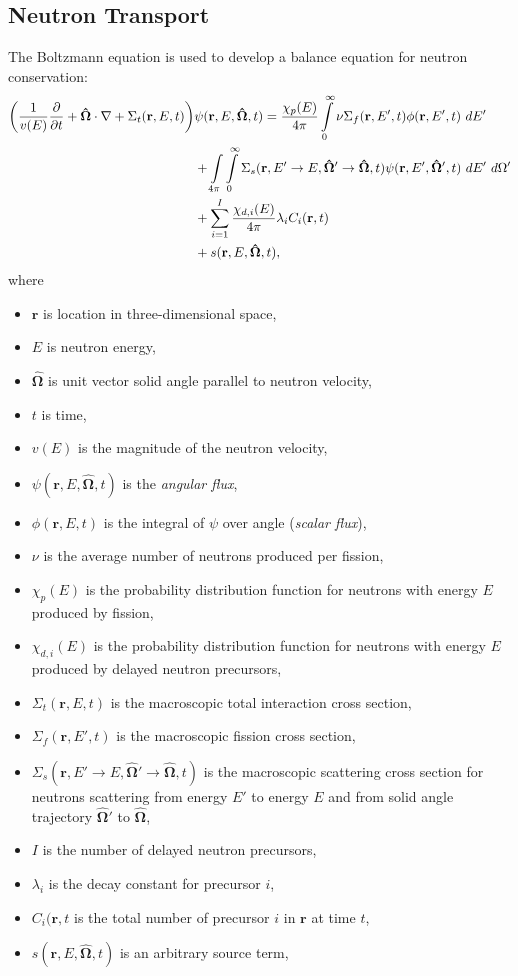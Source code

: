 \subsection{Neutron Transport}
The Boltzmann equation is used to develop a balance equation for neutron conservation: \cite{duderstadt}
\begin{align}\label{eq: neutron trans}
  \qty(\frac{1}{v(E)}\pdv{}{t} + \mathbf{\hat\Omega}\cdot\nabla +
   \Sigma_t(\mathbf{r},E,t))&\psi(\mathbf{r},E,\mathbf{\hat\Omega},t) =
  \frac{\chi_p(E)}{4\pi}\int\limits_{0}^\infty \nu\Sigma_f(\mathbf{r},E',t)\phi(\mathbf{r},E',t)\ dE' \nonumber \\
  & + \int\limits_{4\pi}^{}\int\limits_{0}^\infty \Sigma_s(\mathbf{r},E'\to E,\mathbf{\hat\Omega'\to\hat\Omega},t)
  \psi(\mathbf{r},E',\mathbf{\hat\Omega'},t)  \ dE'\ d\Omega' \nonumber \\
  & + \sum_{i=1}^I \frac{\chi_{d,i}(E)}{4\pi}\lambda_iC_i(\mathbf{r},t) \nonumber \\
  & + s(\mathbf{r},E,\mathbf{\hat\Omega},t),
\end{align}
where
\begin{itemize}
  \item $\mathbf{r}$ is location in three-dimensional space,
  \item $E$ is neutron energy,
  \item $\mathbf{\hat\Omega}$ is unit vector solid angle parallel to neutron velocity,
  \item $t$ is time,
  \item $v(E)$ is the magnitude of the neutron velocity,
  \item $\psi(\mathbf{r},E,\mathbf{\hat\Omega},t)$ is the \emph{angular flux},
  \item $\phi(\mathbf{r},E,t)$ is the integral of $\psi$ over angle (\emph{scalar flux}),
  \item $\nu$ is the average number of neutrons produced per fission,
  \item $\chi_p(E)$ is the probability distribution function for neutrons with energy $E$ produced by fission,
  \item $\chi_{d,i}(E)$ is the probability distribution function for neutrons with energy $E$ produced by
    delayed neutron precursors,
  \item $\Sigma_t(\mathbf{r},E,t)$ is the macroscopic total interaction cross section,
  \item $\Sigma_f(\mathbf{r},E',t)$ is the macroscopic fission cross section,
  \item $\Sigma_s(\mathbf{r},E'\to E,\mathbf{\hat\Omega'\to\hat\Omega},t)$ is the macroscopic scattering cross
    section for neutrons scattering from energy $E'$ to energy $E$ and from solid angle trajectory
    $\mathbf{\hat\Omega'}$ to $\mathbf{\hat\Omega}$,
  \item $I$ is the number of delayed neutron precursors,
  \item $\lambda_i$ is the decay constant for precursor $i$,
  \item $C_i(\mathbf{r},t$ is the total number of precursor $i$ in $\mathbf{r}$ at time $t$,
  \item $s(\mathbf{r},E,\mathbf{\hat\Omega},t)$ is an arbitrary source term,
\end{itemize}
